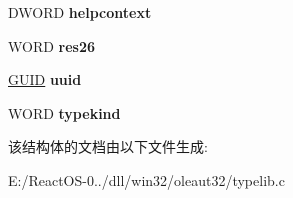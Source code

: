 \begin{DoxyCompactItemize}
D\+W\+O\+RD {\bfseries helpcontext}
\item 
\mbox{\label{struct_s_l_t_g___internal_other_type_info_ae3c62f8005501086b198d1b1f3618919}} 
W\+O\+RD {\bfseries res26}
\item 
\mbox{\label{struct_s_l_t_g___internal_other_type_info_a1ced0034a5ee264a72e5dc868e9a6732}} 
\hyperlink{interface_g_u_i_d}{G\+U\+ID} {\bfseries uuid}
\item 
\mbox{\label{struct_s_l_t_g___internal_other_type_info_a0c23476147c140b4316dc7b26de8e399}} 
W\+O\+RD {\bfseries typekind}
\end{DoxyCompactItemize}


该结构体的文档由以下文件生成\+:\begin{DoxyCompactItemize}
\item 
E\+:/\+React\+O\+S-\/0../dll/win32/oleaut32/typelib.\+c\end{DoxyCompactItemize}
